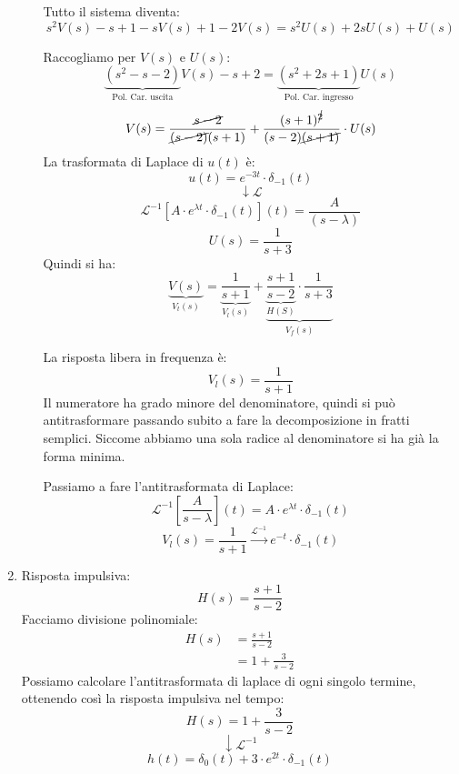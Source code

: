 \documentclass[a4paper]{article}
\begin{document}
\begin{example}
\begin{enumerate}
\begin{enumerate}
          \vspace{1em}
          \noindent
          Tutto il sistema diventa:
          \[
          s^2 V(s) - s + 1 - s V(s) + 1 - 2V(s) = s^2 U(s) + 2s U(s) + U(s)
          \] 

          Raccogliamo per \( V(s) \) e \( U(s) \):
          \[
            \underbrace{\left( s^2 - s - 2 \right)}_{\text{Pol. Car. uscita}} V(s) - s + 2 
            = \underbrace{\left( s^2+2s+1 \right)}_{\text{Pol. Car. ingresso}} U(s)
          \] 
          \[
            V(s) = \frac{\cancel{s-2}}{\cancel{(s-2)}(s+1)} + \frac{(s+1)^{\cancel{2}}}{(s-2)\cancel{(s+1)}} \cdot U(s)
          \] 
          La trasformata di Laplace di \( u(t) \) è:
          \[
            u(t) = e^{-3t} \cdot \delta_{-1}(t)
          \] 
          \[
          \downarrow \mathcal{L}
          \] 
          \[
            \mathcal{L}^{-1}\left[ A \cdot e^{\lambda t} \cdot \delta_{-1}(t) \right](t) = \frac{A}{(s-\lambda)}
          \] 
          \[
            U(s) = \frac{1}{s+3}
          \] 
          Quindi si ha:
          \[
            \underbrace{V(s)}_{V_t(s)} = \underbrace{\frac{1}{s+1}}_{V_l(s)} +
            \underbrace{\underbrace{\frac{s+1}{s-2}}_{H(S)} \cdot \frac{1}{s+3}}_{V_f(s)}
          \] 

          \vspace{1em}
          \noindent
          La risposta libera in frequenza è:
          \[
            V_l(s) = \frac{1}{s+1}
          \]
          Il numeratore ha grado minore del denominatore, quindi si può antitrasformare
          passando subito a fare la decomposizione in fratti semplici. Siccome abbiamo
          una sola radice al denominatore si ha già la forma minima.

          Passiamo a fare l'antitrasformata di Laplace:
          \[
            \mathcal{L}^{-1}\left[ \frac{A}{s-\lambda} \right](t) = A \cdot e^{\lambda t} \cdot \delta_{-1}(t)
          \] 
          \[
            V_l(s) = \frac{1}{s+1} \stackrel{\mathcal{L}^{-1}}{\to} e^{-t} \cdot \delta_{-1}(t)
          \] 
      \end{enumerate}

    \item Risposta impulsiva:
      \[
      H(s) = \frac{s+1}{s-2}
      \] 
      Facciamo divisione polinomiale:
      \[
      \begin{aligned}
        H(s) &= \frac{s+1}{s-2}\\
             &= 1 + \frac{3}{s-2}
      \end{aligned}
      \] 
      Possiamo calcolare l'antitrasformata di laplace di ogni singolo termine, ottenendo
      così la risposta impulsiva nel tempo:
      \[
        H(s) = 1 + \frac{3}{s-2}
      \] 
      \[
        \downarrow \mathcal{L}^{-1}
      \] 
      \[
        h(t) = \delta_0(t) + 3 \cdot e^{2t} \cdot \delta_{-1}(t)
      \]



\end{enumerate}
\end{example}
\end{document}
